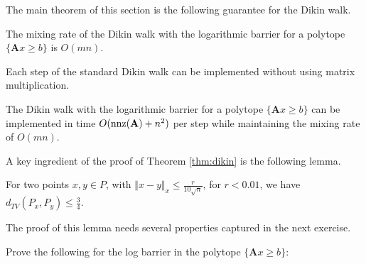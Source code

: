 The main theorem of this section is the following guarantee for the
Dikin walk.
\begin{thm}
\label{thm:dikin}The mixing rate of the Dikin walk with the logarithmic
barrier for a polytope $\{\mathbf{A}x\ge b\}$ is $O(mn)$.
\end{thm}

Each step of the standard Dikin walk can be implemented without using
matrix multiplication.
\begin{thm}
\label{thm:dikin-fast}The Dikin walk with the logarithmic barrier
for a polytope $\{\mathbf{A}x\ge b\}$ can be implemented in time
$O(\mathrm{nnz}(\mathbf{A})+n^{2})$ per step while maintaining the mixing
rate of $O(mn)$.
\end{thm}

A key ingredient of the proof of Theorem \ref{thm:dikin} is the following
lemma.
\begin{lem}
\label{lem:dikin-one-step-1}For two points $x,y\in P$, with $\Vert x-y\Vert_{x}\le\frac{r}{10\sqrt{n}}$,
for $r<0.01$, we have $d_{TV}(P_{x},P_{y})\leq\frac{3}{4}$.
\end{lem}

The proof of this lemma needs several properties captured in the next
exercise.
\begin{xca}
Prove the following for the log barrier in the polytope $\{\mathbf{A}x\ge b\}$:
\end{xca}

